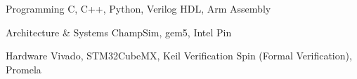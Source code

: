 
\begin{cvskills}
  \cvskill
    {Programming} %
    {C, C++, Python, Verilog HDL, Arm Assembly} %
    
  \cvskill
    {Architecture \& Systems}
    {ChampSim, gem5, Intel Pin}

  \cvskill
    {Hardware}
    {Vivado, STM32CubeMX, Keil}
  \cvskill
    {Verification} %
    {Spin (Formal Verification), Promela} %
    
\end{cvskills}
